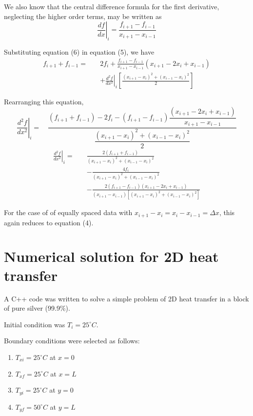 \documentclass[12pt,a4paper,fleqn]{article}
\begin{document}
We also know that the central difference formula for the first derivative,
neglecting the higher order terms, may be written as
\begin{equation}
\left.\frac{df}{dx}\right|_i = \frac{f_{i+1} - f_{i-1}}{x_{i+1} - x_{i-1}}
\end{equation}

Substituting equation (6) in equation (5), we have
\begin{equation*}
\begin{split}
f_{i+1} + f_{i-1} = \quad &2f_i + \frac{f_{i+1} - f_{i-1}}{x_{i+1} -
x_{i-1}}(x_{i+1} - 2x_i + x_{i-1})
\\& + \left.\frac{d^2f}{dx^2}\right|_i\left[\frac{(x_{i+1} - x_i)^2 + (x_{i-1} -
x_i)^2}{2}\right]
\end{split}
\end{equation*}

Rearranging this equation,
\begin{equation*}
\left.\frac{d^2f}{dx^2}\right|_i = \quad \frac{(f_{i+1} + f_{i-1}) - 2f_i -
(f_{i+1} - f_{i-1})\dfrac{(x_{i+1} - 2x_i + x_{i-1})}{x_{i+1} -
x_{i-1}}}{\dfrac{(x_{i+1} - x_i)^2 + (x_{i-1} - x_i)^2}{2}}
\end{equation*}
\begin{equation}
\begin{split}
\left.\frac{d^2f}{dx^2}\right|_i = \quad &\frac{2(f_{i+1} + f_{i-1})}{(x_{i+1} -
x_i)^2 + (x_{i-1} - x_i)^2}
\\& - \frac{4f_i}{(x_{i+1} - x_i)^2 + (x_{i-1} -
x_i)^2}
\\& - \frac{2(f_{i+1} - f_{i-1})(x_{i+1} - 2x_i + x_{i-1})}{(x_{i+1} -
x_{i-1})[(x_{i+1} - x_i)^2 + (x_{i-1} - x_i)^2]}
\end{split}
\end{equation}

For the case of of equally spaced data with $x_{i+1} - x_i = x_i -
x_{i-1} = \Delta x$, this again reduces to equation (4).

\newpage
\section*{Numerical solution for 2D heat transfer}
A C++ code was written to solve a simple problem of 2D heat transfer in a block
of pure silver (99.9\%).

Initial condition was $T_i=25^{\circ}C$.

Boundary conditions were selected as follows:
\begin{enumerate}
\item $T_{xi}=25^{\circ}C$ at $x=0$
\item $T_{xf}=25^{\circ}C$ at $x=L$
\item $T_{yi}=25^{\circ}C$ at $y=0$
\item $T_{yf}=50^{\circ}C$ at $y=L$
\end{enumerate}
\end{document}
